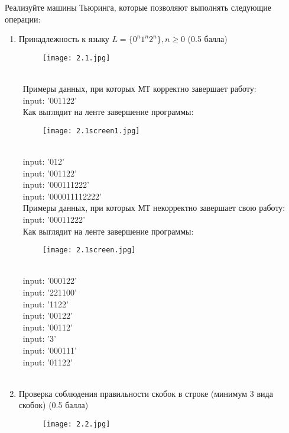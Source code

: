 \documentclass[a4paper]{article}
\begin{document}
Реализуйте машины Тьюринга, которые позволяют выполнять следующие операции:
\begin{enumerate}
    \item Принадлежность к языку $L = \{ 0^n1^n2^n \}, n \ge 0$ (0.5 балла)
    \begin{figure}[h]
        \centering
        \texttt{[image: 2.1.jpg]}
    \end{figure}
    \\
\ Примеры данных, при которых МТ корректно завершает работу:\\
\ input: '001122' \\
\ Как выглядит на ленте завершение программы:\\
\begin{figure}[h]
        \centering
        \texttt{[image: 2.1screen1.jpg]}
\end{figure}
\\
\ input: '012' \\
\ input: '001122' \\
\ input: '000111222' \\
\ input: '000011112222' \\
\ Примеры данных, при которых МТ некорректно завершает свою работу:\\
\ input: '00011222'\\
\ Как выглядит на ленте завершение программы:\\
\begin{figure}[h]
        \centering
        \texttt{[image: 2.1screen.jpg]}
\end{figure}
\\
\ input: '000122'\\
\ input: '221100'\\
\ input: '1122'\\
\ input: '00122'\\
\ input: '00112'\\
\ input: '3'\\
\ input: '000111'\\
\ input: '01122'\\
\\ \newpage
    \item Проверка соблюдения правильности скобок в строке (минимум 3 вида скобок) (0.5 балла)
\\
\begin{figure}[h]
        \centering
        \texttt{[image: 2.2.jpg]}
\end{figure}\\ 

\end{enumerate}
\end{document}
